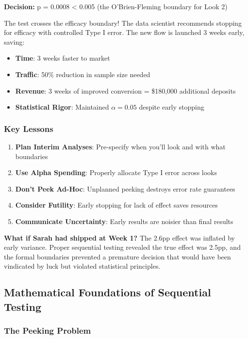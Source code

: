\textbf{Decision:} p = 0.0008 < 0.005 (the O'Brien-Fleming boundary for Look 2)

The test crosses the efficacy boundary! The data scientist recommends stopping for efficacy with controlled Type I error. The new flow is launched 3 weeks early, saving:
\begin{itemize}
    \item \textbf{Time}: 3 weeks faster to market
    \item \textbf{Traffic}: 50\% reduction in sample size needed
    \item \textbf{Revenue}: 3 weeks of improved conversion = \$180,000 additional deposits
    \item \textbf{Statistical Rigor}: Maintained $\alpha = 0.05$ despite early stopping
\end{itemize}

\subsubsection{Key Lessons}

\begin{enumerate}
    \item \textbf{Plan Interim Analyses}: Pre-specify when you'll look and with what boundaries
    \item \textbf{Use Alpha Spending}: Properly allocate Type I error across looks
    \item \textbf{Don't Peek Ad-Hoc}: Unplanned peeking destroys error rate guarantees
    \item \textbf{Consider Futility}: Early stopping for lack of effect saves resources
    \item \textbf{Communicate Uncertainty}: Early results are noisier than final results
\end{enumerate}

\textbf{What if Sarah had shipped at Week 1?} The 2.6pp effect was inflated by early variance. Proper sequential testing revealed the true effect was 2.5pp, and the formal boundaries prevented a premature decision that would have been vindicated by luck but violated statistical principles.

\subsection{Mathematical Foundations of Sequential Testing}

\subsubsection{The Peeking Problem}

